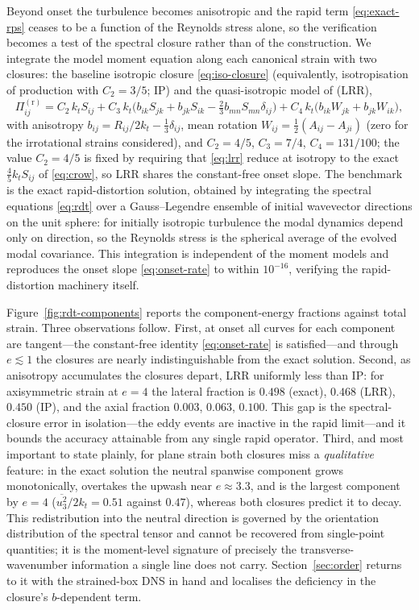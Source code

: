 \documentclass[11pt,a4paper]{article}
\begin{document}
Beyond onset the turbulence becomes anisotropic and the rapid term
\eqref{eq:exact-rps} ceases to be a function of the Reynolds stress
alone, so the verification becomes a test of the spectral closure rather
than of the construction. We integrate the model moment equation along
each canonical strain with two closures: the baseline isotropic closure
\eqref{eq:iso-closure} (equivalently, isotropisation of production with
$C_2=3/5$; IP) and the quasi-isotropic model of
\citet{LaunderReeceRodi1975} (LRR),
\begin{equation}
  \Pi^{(\mathrm r)}_{ij} = C_2\,k_t S_{ij}
  + C_3\,k_t\big(b_{ik}S_{jk}+b_{jk}S_{ik}
  -\tfrac{2}{3}b_{mn}S_{mn}\delta_{ij}\big)
  + C_4\,k_t\big(b_{ik}W_{jk}+b_{jk}W_{ik}\big),
  \label{eq:lrr}
\end{equation}
with anisotropy $b_{ij}=R_{ij}/2k_t-\tfrac13\delta_{ij}$, mean rotation
$W_{ij}=\tfrac12(A_{ij}-A_{ji})$ (zero for the irrotational strains
considered), and $C_2=4/5$, $C_3=7/4$, $C_4=131/100$; the value
$C_2=4/5$ is fixed by requiring that \eqref{eq:lrr} reduce at isotropy to
the exact $\tfrac45k_tS_{ij}$ of \eqref{eq:crow}, so LRR shares the
constant-free onset slope. The benchmark is the exact rapid-distortion
solution, obtained by integrating the spectral equations \eqref{eq:rdt}
over a Gauss--Legendre ensemble of initial wavevector directions on the
unit sphere: for initially isotropic turbulence the modal dynamics depend
only on direction, so the Reynolds stress is the spherical average of the
evolved modal covariance. This integration is independent of the moment
models and reproduces the onset slope \eqref{eq:onset-rate} to within
$10^{-16}$, verifying the rapid-distortion machinery itself.

Figure~\ref{fig:rdt-components} reports the component-energy fractions
against total strain. Three observations follow. First, at onset all
curves for each component are tangent---the constant-free identity
\eqref{eq:onset-rate} is satisfied---and through $e\lesssim1$ the
closures are nearly indistinguishable from the exact solution. Second,
as anisotropy accumulates the closures depart, LRR uniformly less than
IP: for axisymmetric strain at $e=4$ the lateral fraction is $0.498$
(exact), $0.468$ (LRR), $0.450$ (IP), and the axial fraction $0.003$,
$0.063$, $0.100$. This gap is the spectral-closure error in
isolation---the eddy events are inactive in the rapid limit---and it
bounds the accuracy attainable from any single rapid operator. Third,
and most important to state plainly, for plane strain both closures miss
a \emph{qualitative} feature: in the exact solution the neutral spanwise
component grows monotonically, overtakes the upwash near $e\approx3.3$,
and is the largest component by $e=4$
($\overline{u_3^2}/2k_t=0.51$ against $0.47$), whereas both closures
predict it to decay. This redistribution into the neutral direction is
governed by the orientation distribution of the spectral tensor and
cannot be recovered from single-point quantities; it is the moment-level
signature of precisely the transverse-wavenumber information a single
line does not carry. Section~\ref{sec:order} returns to it with the
strained-box DNS in hand and localises the deficiency in the closure's
$b$-dependent term.
\end{document}
